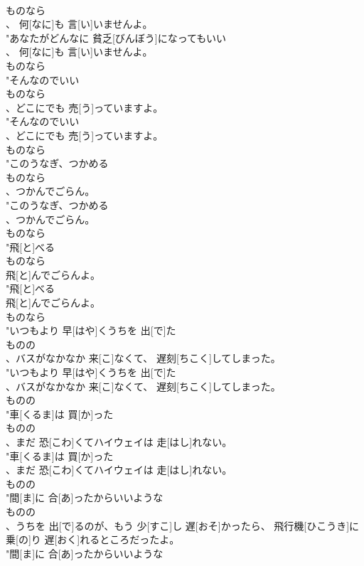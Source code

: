 \documentclass[8pt]{extreport}
\begin{document}
\begin{CJK}{UTF8}{min}
\\	ものなら
\\	、 何[なに]も 言[い]いませんよ。
\\	"あなたがどんなに 貧乏[びんぼう]になってもいい
\\	、 何[なに]も 言[い]いませんよ。
\\	ものなら
\\	"そんなのでいい
\\	ものなら
\\	、どこにでも 売[う]っていますよ。
\\	"そんなのでいい
\\	、どこにでも 売[う]っていますよ。
\\	ものなら
\\	"このうなぎ、つかめる
\\	ものなら
\\	、つかんでごらん。
\\	"このうなぎ、つかめる
\\	、つかんでごらん。
\\	ものなら
\\	"飛[と]べる
\\	ものなら
\\	飛[と]んでごらんよ。
\\	"飛[と]べる
\\	飛[と]んでごらんよ。
\\	ものなら
\\	"いつもより 早[はや]くうちを 出[で]た
\\	ものの
\\	、バスがなかなか 来[こ]なくて、 遅刻[ちこく]してしまった。
\\	"いつもより 早[はや]くうちを 出[で]た
\\	、バスがなかなか 来[こ]なくて、 遅刻[ちこく]してしまった。
\\	ものの
\\	"車[くるま]は 買[か]った
\\	ものの
\\	、まだ 恐[こわ]くてハイウェイは 走[はし]れない。
\\	"車[くるま]は 買[か]った
\\	、まだ 恐[こわ]くてハイウェイは 走[はし]れない。
\\	ものの
\\	"間[ま]に 合[あ]ったからいいような
\\	ものの
\\	、うちを 出[で]るのが、もう 少[すこ]し 遅[おそ]かったら、 飛行機[ひこうき]に 乗[の]り 遅[おく]れるところだったよ。
\\	"間[ま]に 合[あ]ったからいいような

\end{CJK}
\end{document}
